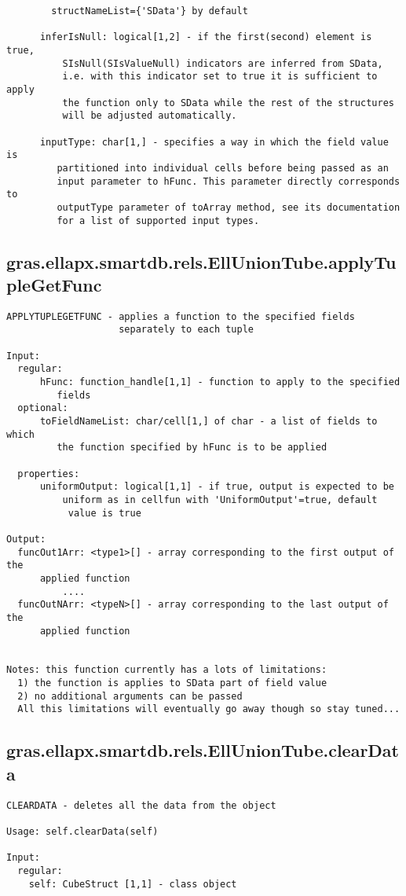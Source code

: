 \begin{verbatim}
        structNameList={'SData'} by default

      inferIsNull: logical[1,2] - if the first(second) element is true,
          SIsNull(SIsValueNull) indicators are inferred from SData,
          i.e. with this indicator set to true it is sufficient to apply
          the function only to SData while the rest of the structures
          will be adjusted automatically.

      inputType: char[1,] - specifies a way in which the field value is
         partitioned into individual cells before being passed as an
         input parameter to hFunc. This parameter directly corresponds to
         outputType parameter of toArray method, see its documentation
         for a list of supported input types.
\end{verbatim}
\subsection{\texorpdfstring{gras.ellapx.smartdb.rels.EllUnionTube.applyTupleGetFunc}{applyTupleGetFunc}}\label{method:gras.ellapx.smartdb.rels.EllUnionTube.applyTupleGetFunc}
\begin{verbatim}
APPLYTUPLEGETFUNC - applies a function to the specified fields
                    separately to each tuple

Input:
  regular:
      hFunc: function_handle[1,1] - function to apply to the specified
         fields
  optional:
      toFieldNameList: char/cell[1,] of char - a list of fields to which
         the function specified by hFunc is to be applied

  properties:
      uniformOutput: logical[1,1] - if true, output is expected to be
          uniform as in cellfun with 'UniformOutput'=true, default
           value is true

Output:
  funcOut1Arr: <type1>[] - array corresponding to the first output of the
      applied function
          ....
  funcOutNArr: <typeN>[] - array corresponding to the last output of the
      applied function


Notes: this function currently has a lots of limitations:
  1) the function is applies to SData part of field value
  2) no additional arguments can be passed
  All this limitations will eventually go away though so stay tuned...
\end{verbatim}
\subsection{\texorpdfstring{gras.ellapx.smartdb.rels.EllUnionTube.clearData}{clearData}}\label{method:gras.ellapx.smartdb.rels.EllUnionTube.clearData}
\begin{verbatim}
CLEARDATA - deletes all the data from the object

Usage: self.clearData(self)

Input:
  regular:
    self: CubeStruct [1,1] - class object
\end{verbatim}
